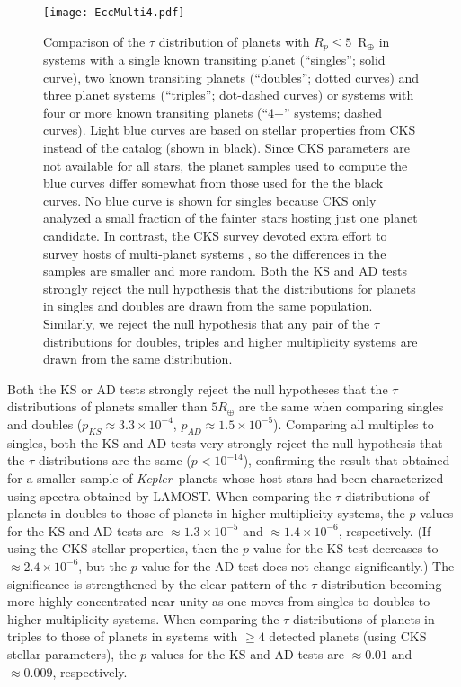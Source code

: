 \documentclass{aastex62}
\newcommand{\ik}{{\it Kepler~}}
\begin{document}
\begin{figure}
    \centering
    \texttt{[image: EccMulti4.pdf]}
    \caption{Comparison of the $\tau$ distribution of planets with $R_p\le 5$~R$_{\oplus}$ in systems with a single known transiting planet (``singles''; solid curve), two known transiting planets (``doubles''; dotted curves) and three planet systems (``triples''; dot-dashed curves) or systems with four or more known transiting planets (``4+'' systems; dashed curves). Light blue curves are based on stellar properties from CKS \citep{Fulton:2018} instead of the \cite{Berger:2020a} catalog (shown in black).  Since CKS parameters are not available for all stars, the planet samples used to compute the blue curves  differ somewhat from those used for the the black curves. No blue curve is shown for singles because CKS only analyzed a small fraction of the fainter stars hosting just one planet candidate. In contrast, the CKS survey devoted extra effort to survey hosts of multi-planet systems \citep{Petigura:2017}, so the differences in the samples are smaller and more random.  Both the KS and AD tests strongly reject the null hypothesis that the distributions for planets in singles and doubles are drawn from the same population.  Similarly,  we reject the null hypothesis that any pair of the $\tau$ distributions for doubles, triples and higher multiplicity systems are drawn from the same distribution.  %
    }
    \label{fig:EccMulti}
\end{figure}

Both the KS or AD tests strongly reject the null hypotheses that the $\tau$ distributions of planets smaller than $5 R_{\oplus}$ are the same when comparing 
singles and doubles ($p_{KS}\approx 3.3\times10^{-4}$, $p_{AD}\approx 1.5 \times 10^{-5}$).  Comparing all multiples to singles, both the  KS and AD tests very strongly reject the null hypothesis that the $\tau$ distributions are the same ($p<10^{-14}$), confirming the result that \cite{Xie:2016} obtained for a smaller sample of \ik planets whose host stars had been characterized using spectra obtained by LAMOST. 
When comparing the $\tau$ distributions of planets in doubles to those of planets in higher multiplicity systems, the $p$-values for the KS and AD tests are $\approx 1.3\times10^{-5}$ and $\approx 1.4\times10^{-6}$, respectively.  (If using the CKS stellar properties, then the $p$-value for the KS test decreases to $\approx 2.4\times10^{-6}$, but the $p$-value for the AD test does not change significantly.) The significance is strengthened by the clear pattern of the $\tau$ distribution becoming more highly concentrated near unity as one moves from singles to doubles to higher multiplicity systems. 
When comparing the $\tau$ distributions of planets in triples to those of planets in systems with $\ge 4$ detected planets (using CKS stellar parameters), the $p$-values for the KS and AD tests are $\approx 0.01$ and $\approx 0.009$, respectively.  
\end{document}
